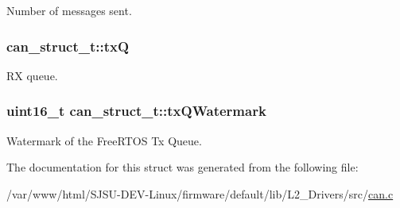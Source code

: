 Number of messages sent. 

\subsubsection[{\texorpdfstring{txQ}{txQ}}]{ can\+\_\+struct\+\_\+t\+::txQ}\hypertarget{structcan__struct__t_a39cfcc33222d5607be5ad2dd1d92e7cd}{}\label{structcan__struct__t_a39cfcc33222d5607be5ad2dd1d92e7cd}


RX queue. 

\subsubsection[{\texorpdfstring{tx\+Q\+Watermark}{txQWatermark}}]{\setlength{\rightskip}{0pt plus 5cm}uint16\+\_\+t can\+\_\+struct\+\_\+t\+::tx\+Q\+Watermark}\hypertarget{structcan__struct__t_ac7b27780bb731be3afddf397c3a02c15}{}\label{structcan__struct__t_ac7b27780bb731be3afddf397c3a02c15}


Watermark of the Free\+R\+T\+OS Tx Queue. 



The documentation for this struct was generated from the following file\+:\begin{DoxyCompactItemize}
\item 
/var/www/html/\+S\+J\+S\+U-\/\+D\+E\+V-\/\+Linux/firmware/default/lib/\+L2\+\_\+\+Drivers/src/\hyperlink{can_8c}{can.\+c}\end{DoxyCompactItemize}
